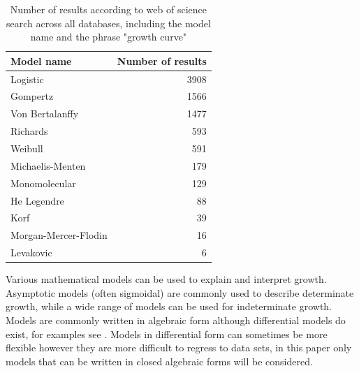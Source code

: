 \documentclass[12pt,a4paper]{article}
\begin{document}
		\begin{table}[h]
		\centering
		\begin{tabular}{l r}
			\hline
			Model name & Number of results \\
			\hline
			Logistic&3908\\
			Gompertz & 1566\\
			Von Bertalanffy&1477\\
			Richards       & 593\\
			Weibull&591\\
			Michaelis-Menten&179\\
			Monomolecular&129\\
			He Legendre&88\\
			Korf&39\\
			Morgan-Mercer-Flodin & 16\\
			Levakovic&6\\
			\hline
		\end{tabular}
		\caption{Number of results according to web of science search across all databases, including the model name and the phrase "growth curve"}\label{tab:Popularity of curves}
	\end{table}
	Various mathematical models can be used to explain and interpret growth. Asymptotic models (often sigmoidal) are commonly used to describe determinate growth, while a wide range of models can be used for indeterminate growth. Models are commonly written in algebraic form although differential models do exist, for examples see \textcite{Myhrvold2013,Brunner2019}. Models in differential form can sometimes be more flexible however they are more difficult to regress to data sets, in this paper only models that can be written in closed algebraic forms will be considered.
	
\end{document}

